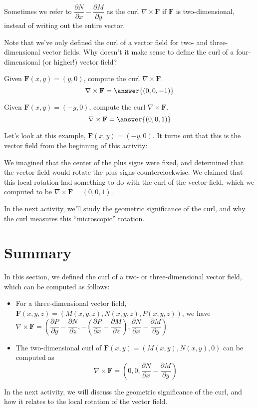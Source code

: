 \documentclass{ximera}
\begin{document}
Sometimes we refer to $\dfrac{\partial N}{\partial x} - \dfrac{\partial M}{\partial y}$ as the curl $\nabla\times\mathbf{F}$ if $\mathbf{F}$ is two-dimensional, instead of writing out the entire vector.

Note that we've only defined the curl of a vector field for two- and three-dimensional vector fields. Why doesn't it make sense to define the curl of a four-dimensional (or higher!) vector field?
\begin{multipleChoice}
\end{multipleChoice}

\begin{problem}
Given $\mathbf{F}(x,y)=(y,0)$, compute the curl $\nabla\times\mathbf{F}$.
\[
\nabla\times\mathbf{F} = \answer{(0,0,-1)}
\]
\end{problem}

\begin{problem}
Given $\mathbf{F}(x,y)=(-y,0)$, compute the curl $\nabla\times\mathbf{F}$.
\[
\nabla\times\mathbf{F} = \answer{(0,0,1)}
\]
\end{problem}

Let's look at this example, $\mathbf{F}(x,y) = (-y,0)$. It turns out that this is the vector field from the beginning of this activity:


We imagined that the center of the plus signs were fixed, and determined that the vector field would rotate the plus signs counterclockwise. We claimed that this local rotation had something to do with the curl of the vector field, which we computed to be $\nabla\times\mathbf{F} = (0,0,1)$.

In the next activity, we'll study the geometric significance of the curl, and why the curl measures this ``microscopic'' rotation.

\section{Summary}

In this section, we defined the curl of a two- or three-dimensional vector field, which can be computed as follows:
\begin{itemize}
\item For a three-dimensional vector field, $\mathbf{F}(x,y,z) = (M(x,y,z), N(x,y,z), P(x,y,z))$, we have $\nabla\times\mathbf{F} = \left(\dfrac{\partial P}{\partial y}-\dfrac{\partial N}{\partial z}, -\left(\dfrac{\partial P}{\partial x}-\dfrac{\partial M}{\partial z}\right), \dfrac{\partial N}{\partial x} - \dfrac{\partial M}{\partial y}\right)$
\item The two-dimensional curl of $\mathbf{F}(x,y) = (M(x,y),N(x,y),0)$ can be computed as
\[
\nabla\times \mathbf{F} = \left(0,0,\dfrac{\partial N}{\partial x} - \dfrac{\partial M}{\partial y}\right)
\]
\end{itemize}

In the next activity, we will discuss the geometric significance of the curl, and how it relates to the local rotation of the vector field.
\end{document}
